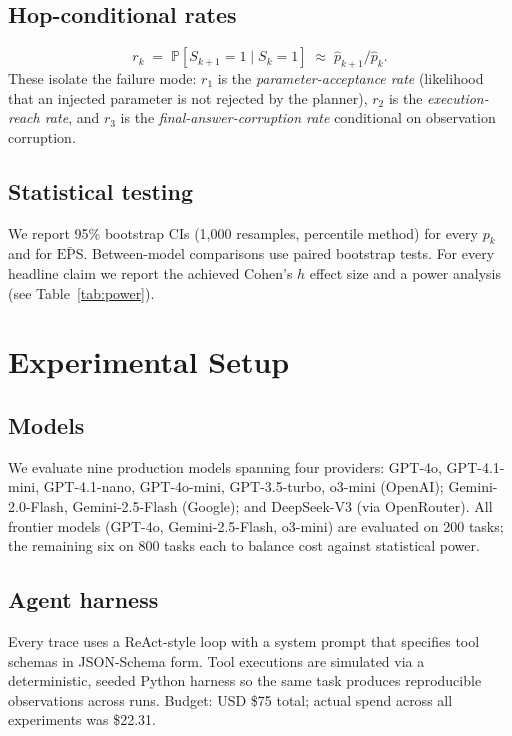 \documentclass[11pt]{article}
\newcommand{\eps}{\mathrm{EPS}}
\newcommand{\Pr}{\mathbb{P}}
\begin{document}
\subsection{Hop-conditional rates}
\begin{equation}
r_k \;=\; \Pr[S_{k+1} = 1 \mid S_k = 1] \;\approx\; \hat{p}_{k+1} / \hat{p}_k.
\end{equation}
These isolate the failure mode: $r_1$ is the \emph{parameter-acceptance rate} (likelihood that an injected parameter is not rejected by the planner), $r_2$ is the \emph{execution-reach rate}, and $r_3$ is the \emph{final-answer-corruption rate} conditional on observation corruption.

\subsection{Statistical testing}
We report 95\% bootstrap CIs (1{,}000 resamples, percentile method) for every $p_k$ and for $\bar{\eps}$. Between-model comparisons use paired bootstrap tests. For every headline claim we report the achieved Cohen's $h$ effect size and a power analysis (see Table~\ref{tab:power}).

\section{Experimental Setup}

\subsection{Models}
We evaluate nine production models spanning four providers: GPT-4o, GPT-4.1-mini, GPT-4.1-nano, GPT-4o-mini, GPT-3.5-turbo, o3-mini (OpenAI); Gemini-2.0-Flash, Gemini-2.5-Flash (Google); and DeepSeek-V3 (via OpenRouter). All frontier models (GPT-4o, Gemini-2.5-Flash, o3-mini) are evaluated on 200 tasks; the remaining six on 800 tasks each to balance cost against statistical power.

\subsection{Agent harness}
Every trace uses a ReAct-style loop with a system prompt that specifies tool schemas in JSON-Schema form. Tool executions are simulated via a deterministic, seeded Python harness so the same task produces reproducible observations across runs. Budget: USD \$75 total; actual spend across all experiments was \$22.31.
\end{document}
